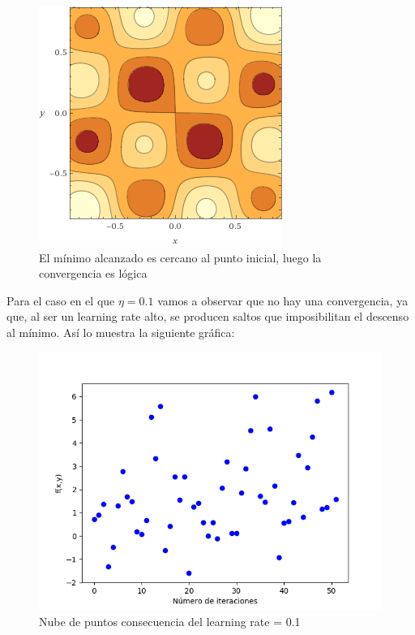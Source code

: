 \begin{figure}[H] %
	\centering
	\includegraphics[scale=0.6]{f2.png}  %
	\caption{El mínimo alcanzado es cercano al punto inicial, luego la convergencia es lógica} 
	\label{fig:f2}
\end{figure}


Para el caso en el que $\eta=0.1$ vamos a observar que no hay una convergencia, ya que, al ser un learning rate alto, se producen saltos que imposibilitan el descenso al mínimo. Así lo muestra la siguiente gráfica:

\begin{figure}[H] %
	\centering
	\includegraphics[scale=0.6]{f3.png}  %
	\caption{Nube de puntos consecuencia del learning rate = 0.1} 
	\label{fig:f3}
\end{figure}

